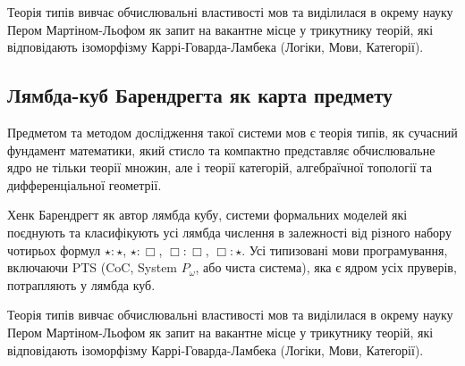 Теорія типів вивчає обчислювальні властивості мов та виділилася
в окрему науку Пером Мартіном-Льофом як запит на вакантне місце
у трикутнику теорій, які відповідають ізоморфізму
Каррі-Говарда-Ламбека (Логіки, Мови, Категорії).

\newpage
\subsection*{Лямбда-куб Барендрегта як карта предмету}
Предметом та методом дослідження такої системи мов є теорія типів,
як сучасний фундамент математики, який стисло та компактно представляє
обчислювальне ядро не тільки теорії множин,
але і теорії категорій, алгебраїчної топології та дифференціальної геометрії.

Хенк Барендрегт як автор лямбда кубу, системи формальних
моделей які поєднують та класифікують усі лямбда числення в
залежності від різного набору чотирьох формул $\star : \star$,
$\star : \Box$, $\Box : \Box$, $\Box : \star$. Усі типизовані мови
програмування, включаючи PTS (CoC, System $P_\omega$, або чиста система),
яка є ядром усіх пруверів, потрапляють у лямбда куб.

\begin{center}
\end{center}

Теорія типів вивчає обчислювальні властивості мов та виділилася
в окрему науку Пером Мартіном-Льофом як запит на вакантне місце у
трикутнику теорій, які відповідають ізоморфізму
Каррі-Говарда-Ламбека (Логіки, Мови, Категорії).

